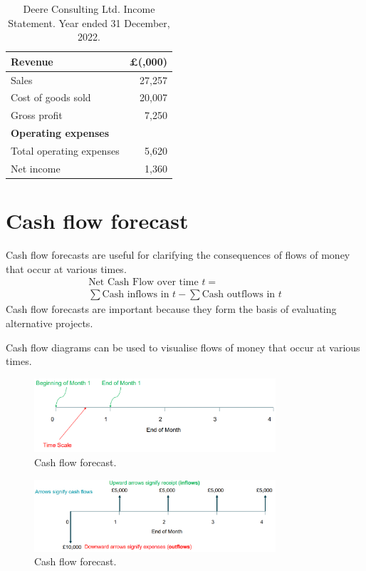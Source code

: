 \begin{table}[H]
    \centering
    \begin{tabular}{@{}lr@{}}
        \toprule
        \textbf{Revenue}            & \textbf{\pounds (,000)} \\
        \midrule
        Sales                       & 27,257                  \\
        Cost of goods sold          & 20,007                  \\
        \midrule
        Gross profit                & 7,250                   \\
        \midrule
        \textbf{Operating expenses} &                         \\
        \midrule
        Total operating expenses    & 5,620                   \\
        \midrule
        Net income                  & 1,360                   \\
        \bottomrule
    \end{tabular}
    \caption{Deere Consulting Ltd. Income Statement. Year ended 31 December, 2022.}
\end{table}
\section{Cash flow forecast}
Cash flow forecasts are useful for clarifying the consequences of flows of money that occur at various times.
\begin{gather}
    \textrm{Net Cash Flow over time } t =\\
    \sum \textrm{Cash inflows in $t$} - \sum \textrm{Cash outflows in $t$}
\end{gather}
Cash flow forecasts are important because they form the basis of evaluating alternative projects.

Cash flow diagrams can be used to visualise flows of money that occur at various times.
\begin{figure}[H]
    \centering
    \includegraphics[width = 0.8\textwidth]{img/figure52.png}
    \caption{Cash flow forecast.}
\end{figure}
\begin{figure}[H]
    \centering
    \includegraphics[width = 0.8\textwidth]{img/figure53.png}
    \caption{Cash flow forecast.}
\end{figure}
